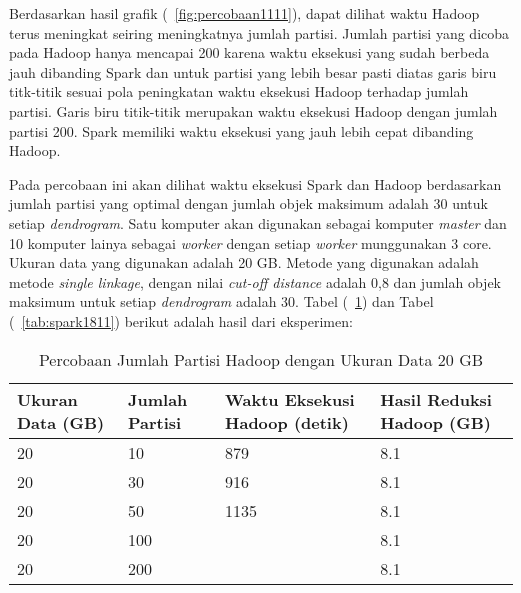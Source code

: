 Berdasarkan hasil grafik (~\ref{fig:percobaan1111}), dapat dilihat waktu Hadoop terus meningkat seiring meningkatnya jumlah partisi. Jumlah partisi yang dicoba pada Hadoop hanya mencapai 200 karena waktu eksekusi yang sudah berbeda jauh dibanding Spark dan untuk partisi yang lebih besar pasti diatas garis biru titk-titik sesuai pola peningkatan waktu eksekusi Hadoop terhadap jumlah partisi. Garis biru titik-titik merupakan waktu eksekusi Hadoop dengan jumlah partisi 200. Spark memiliki waktu eksekusi yang jauh lebih cepat dibanding Hadoop. 




Pada percobaan ini akan dilihat waktu eksekusi Spark dan Hadoop berdasarkan jumlah partisi yang optimal dengan jumlah objek maksimum adalah 30 untuk setiap \textit{dendrogram}. Satu komputer akan digunakan sebagai komputer \textit{master} dan 10 komputer lainya sebagai \textit{worker} dengan setiap \textit{worker} munggunakan 3 core. Ukuran data yang digunakan adalah 20 GB. Metode yang digunakan adalah metode \textit{single linkage}, dengan nilai \textit{cut-off distance} adalah 0,8 dan jumlah objek maksimum untuk setiap \textit{dendrogram} adalah 30. Tabel (~\ref{tab:spark1711}) dan Tabel (~\ref{tab:spark1811}) berikut adalah hasil dari eksperimen:





\begin{table}[H] 
	\centering 
	\caption{Percobaan Jumlah Partisi Hadoop dengan Ukuran Data 20 GB}
	\label{tab:spark1711}
	\begin{tabular}{|p{3cm}|p{3cm}|p{4cm}|p{4cm}|}
\hline
Ukuran Data (GB) & Jumlah Partisi &  Waktu Eksekusi Hadoop (detik) & Hasil Reduksi Hadoop (GB)\\
\hline
20 & 10 & 879  & 8.1  \\
\hline
20 & 30 & 916  & 8.1  \\
\hline
20 & 50 & 1135  & 8.1  \\
\hline
20 & 100 &   & 8.1  \\
\hline
20 & 200 &   & 8.1  \\
\hline


\hline

	\end{tabular} 
\end{table}





